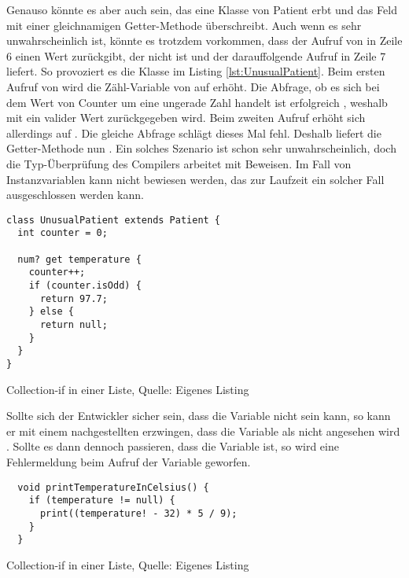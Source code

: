 Genauso könnte es aber auch sein, das eine Klasse von Patient erbt und das Feld  mit einer gleichnamigen Getter-Methode überschreibt. Auch wenn es sehr unwahrscheinlich ist, könnte es trotzdem vorkommen, dass der Aufruf von  in Zeile 6 einen Wert zurückgibt, der nicht  ist und der darauffolgende Aufruf in Zeile 7  liefert. So provoziert es die Klasse  im Listing \ref{lst:UnusualPatient}. Beim ersten Aufruf von  wird die Zähl-Variable  von  auf  erhöht. Die Abfrage, ob es sich bei dem Wert von Counter um eine ungerade Zahl handelt ist erfolgreich , weshalb mit  ein valider Wert zurückgegeben wird. Beim zweiten Aufruf erhöht sich  allerdings auf . Die gleiche Abfrage schlägt dieses Mal fehl. Deshalb liefert die Getter-Methode nun  . Ein solches Szenario ist schon sehr unwahrscheinlich, doch die Typ-Überprüfung des Compilers arbeitet mit Beweisen. Im Fall von Instanzvariablen kann nicht bewiesen werden, das zur Laufzeit ein solcher Fall ausgeschlossen werden kann.

\ifincludeall
  \begin{listing}[ht]
    \begin{verbatim}
class UnusualPatient extends Patient {
  int counter = 0;

  num? get temperature {
    counter++;
    if (counter.isOdd) {
      return 97.7;
    } else {
      return null;
    }
  }
}
\end{verbatim}
    \caption[Collection-if in einer Liste]{Collection-if in einer Liste, Quelle: Eigenes Listing}
    \label{lst:UnusualPatient}
  \end{listing}
\fi


Sollte sich der Entwickler sicher sein, dass die Variable nicht  sein kann, so kann er mit einem nachgestellten \IC{!} erzwingen, dass die Variable als nicht  angesehen wird . Sollte es dann dennoch passieren, dass die Variable  ist, so wird eine Fehlermeldung beim Aufruf der Variable geworfen.

\ifincludeall
  \begin{listing}[ht]
    \begin{verbatim}
  void printTemperatureInCelsius() {
    if (temperature != null) {
      print((temperature! - 32) * 5 / 9);
    }
  }
    \end{verbatim}
    \caption[Collection-if in einer Liste]{Collection-if in einer Liste, Quelle: Eigenes Listing}
    \label{lst:printTemperatureInCelsiusLocalVariableForceNullCheck}
  \end{listing}
\fi

